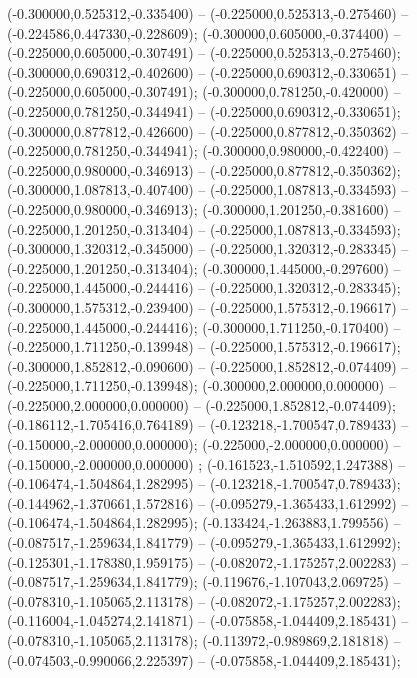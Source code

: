  (-0.300000,0.525312,-0.335400) -- (-0.225000,0.525313,-0.275460) -- (-0.224586,0.447330,-0.228609);
 (-0.300000,0.605000,-0.374400) -- (-0.225000,0.605000,-0.307491) -- (-0.225000,0.525313,-0.275460);
 (-0.300000,0.690312,-0.402600) -- (-0.225000,0.690312,-0.330651) -- (-0.225000,0.605000,-0.307491);
 (-0.300000,0.781250,-0.420000) -- (-0.225000,0.781250,-0.344941) -- (-0.225000,0.690312,-0.330651);
 (-0.300000,0.877812,-0.426600) -- (-0.225000,0.877812,-0.350362) -- (-0.225000,0.781250,-0.344941);
 (-0.300000,0.980000,-0.422400) -- (-0.225000,0.980000,-0.346913) -- (-0.225000,0.877812,-0.350362);
 (-0.300000,1.087813,-0.407400) -- (-0.225000,1.087813,-0.334593) -- (-0.225000,0.980000,-0.346913);
 (-0.300000,1.201250,-0.381600) -- (-0.225000,1.201250,-0.313404) -- (-0.225000,1.087813,-0.334593);
 (-0.300000,1.320312,-0.345000) -- (-0.225000,1.320312,-0.283345) -- (-0.225000,1.201250,-0.313404);
 (-0.300000,1.445000,-0.297600) -- (-0.225000,1.445000,-0.244416) -- (-0.225000,1.320312,-0.283345);
 (-0.300000,1.575312,-0.239400) -- (-0.225000,1.575312,-0.196617) -- (-0.225000,1.445000,-0.244416);
 (-0.300000,1.711250,-0.170400) -- (-0.225000,1.711250,-0.139948) -- (-0.225000,1.575312,-0.196617);
 (-0.300000,1.852812,-0.090600) -- (-0.225000,1.852812,-0.074409) -- (-0.225000,1.711250,-0.139948);
 (-0.300000,2.000000,0.000000) -- (-0.225000,2.000000,0.000000) -- (-0.225000,1.852812,-0.074409);
 (-0.186112,-1.705416,0.764189) -- (-0.123218,-1.700547,0.789433) -- (-0.150000,-2.000000,0.000000);
 (-0.225000,-2.000000,0.000000) -- (-0.150000,-2.000000,0.000000) ;
 (-0.161523,-1.510592,1.247388) -- (-0.106474,-1.504864,1.282995) -- (-0.123218,-1.700547,0.789433);
 (-0.144962,-1.370661,1.572816) -- (-0.095279,-1.365433,1.612992) -- (-0.106474,-1.504864,1.282995);
 (-0.133424,-1.263883,1.799556) -- (-0.087517,-1.259634,1.841779) -- (-0.095279,-1.365433,1.612992);
 (-0.125301,-1.178380,1.959175) -- (-0.082072,-1.175257,2.002283) -- (-0.087517,-1.259634,1.841779);
 (-0.119676,-1.107043,2.069725) -- (-0.078310,-1.105065,2.113178) -- (-0.082072,-1.175257,2.002283);
 (-0.116004,-1.045274,2.141871) -- (-0.075858,-1.044409,2.185431) -- (-0.078310,-1.105065,2.113178);
 (-0.113972,-0.989869,2.181818) -- (-0.074503,-0.990066,2.225397) -- (-0.075858,-1.044409,2.185431);
